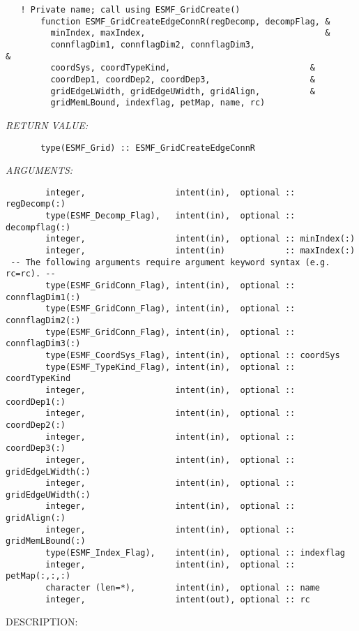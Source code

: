  
\begin{verbatim}   ! Private name; call using ESMF_GridCreate()
       function ESMF_GridCreateEdgeConnR(regDecomp, decompFlag, &
         minIndex, maxIndex,                                    &
         connflagDim1, connflagDim2, connflagDim3,                       &
         coordSys, coordTypeKind,                            &
         coordDep1, coordDep2, coordDep3,                    &
         gridEdgeLWidth, gridEdgeUWidth, gridAlign,          &
         gridMemLBound, indexflag, petMap, name, rc)
 \end{verbatim}{\em RETURN VALUE:}
\begin{verbatim}       type(ESMF_Grid) :: ESMF_GridCreateEdgeConnR\end{verbatim}{\em ARGUMENTS:}
\begin{verbatim}        integer,                  intent(in),  optional :: regDecomp(:)
        type(ESMF_Decomp_Flag),   intent(in),  optional :: decompflag(:)
        integer,                  intent(in),  optional :: minIndex(:)
        integer,                  intent(in)            :: maxIndex(:)
 -- The following arguments require argument keyword syntax (e.g. rc=rc). --
        type(ESMF_GridConn_Flag), intent(in),  optional :: connflagDim1(:)
        type(ESMF_GridConn_Flag), intent(in),  optional :: connflagDim2(:)
        type(ESMF_GridConn_Flag), intent(in),  optional :: connflagDim3(:)
        type(ESMF_CoordSys_Flag), intent(in),  optional :: coordSys
        type(ESMF_TypeKind_Flag), intent(in),  optional :: coordTypeKind
        integer,                  intent(in),  optional :: coordDep1(:)
        integer,                  intent(in),  optional :: coordDep2(:)
        integer,                  intent(in),  optional :: coordDep3(:)
        integer,                  intent(in),  optional :: gridEdgeLWidth(:)
        integer,                  intent(in),  optional :: gridEdgeUWidth(:)
        integer,                  intent(in),  optional :: gridAlign(:)
        integer,                  intent(in),  optional :: gridMemLBound(:)
        type(ESMF_Index_Flag),    intent(in),  optional :: indexflag
        integer,                  intent(in),  optional :: petMap(:,:,:)
        character (len=*),        intent(in),  optional :: name
        integer,                  intent(out), optional :: rc\end{verbatim}
{\sf DESCRIPTION:\\ }


